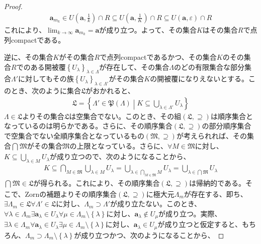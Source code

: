 \documentclass[dvipdfmx]{jsarticle}
\begin{document}
\begin{proof}
\begin{align*}
\mathbf{a}_{m_{k}} \in U\left( \mathbf{a},\frac{1}{k} \right) \cap R \subseteq U\left( \mathbf{a},\frac{1}{K} \right) \cap R \subseteq U\left( \mathbf{a},\varepsilon \right) \cap R
\end{align*}
これにより、$\lim_{k \rightarrow \infty}\mathbf{a}_{m_{k}} = \mathbf{a}$が成り立つ。よって、その集合$K$はその集合$R$で点列compactである。\par
逆に、その集合$K$がその集合$R$で点列compactであるかつ、その集合$K$のその集合$R$でのある開被覆$\left\{ U_{\lambda} \right\}_{\lambda \in \varLambda}$が存在して、その集合$\varLambda$のどの有限集合な部分集合$\varLambda'$に対してもその族$\left\{ U_{\lambda} \right\}_{\lambda \in \varLambda'}$がその集合$K$の開被覆になりえないとする。このとき、次のように集合$\mathfrak{L}$がおかれると、
\begin{align*}
\mathfrak{L} =\left\{ \varLambda'\in \mathfrak{P}(\varLambda) \middle| K \subseteq \bigcup_{\lambda \in \varLambda'} U_{\lambda} \right\}
\end{align*}
$\varLambda\in \mathfrak{L}$よりその集合$\mathfrak{L}$は空集合でない。このとき、その組$\left( \mathfrak{L, \supseteq} \right)$は順序集合となっているのは明らかである。さらに、その順序集合$\left( \mathfrak{L, \supseteq} \right)$の部分順序集合で空集合でない全順序集合となっているもの$\left( \mathfrak{M, \supseteq} \right)$が考えられれば、その集合$\bigcap_{} \mathfrak{M}$がその集合$\mathfrak{M}$の上限となっている。さらに、$\forall M\in \mathfrak{M}$に対し、$K \subseteq \bigcup_{\lambda \in M} U_{\lambda}$が成り立つので、次のようになることから、
\begin{align*}
K \subseteq \bigcap_{M\in \mathfrak{M}} {\bigcup_{\lambda \in M} U_{\lambda}} = \bigcup_{\lambda \in \bigcap_{M\in \mathfrak{M}} M} U_{\lambda} = \bigcup_{\lambda \in \bigcap_{} \mathfrak{M}} U_{\lambda}
\end{align*}
$\bigcap_{} \mathfrak{M}\in \mathfrak{L}$が得られる。これにより、その順序集合$\left( \mathfrak{L, \supseteq} \right)$は帰納的である。そこで、Zornの補題よりその順序集合$\left( \mathfrak{L, \supseteq} \right)$に極大元$\varLambda_{m}$が存在する、即ち、$\exists\varLambda_{m}\in \mathfrak{L\forall}\varLambda'\in \mathfrak{L}$に対し、$\varLambda_{m} \supset \varLambda'$が成り立たない。このとき、$\forall\lambda \in \varLambda_{m}\exists\mathbf{a}_{\lambda} \in U_{\lambda}\forall\mu \in \varLambda_{m} \setminus \left\{ \lambda \right\}$に対し、$\mathbf{a}_{\lambda} \notin U_{\mu}$が成り立つ。実際、$\exists\lambda \in \varLambda_{m}\forall\mathbf{a}_{\lambda} \in U_{\lambda}\exists\mu \in \varLambda_{m} \setminus \left\{ \lambda \right\}$に対し、$\mathbf{a}_{\lambda} \in U_{\mu}$が成り立つと仮定すると、もちろん、$\varLambda_{m} \supset \varLambda_{m} \setminus \left\{ \lambda \right\}$が成り立つかつ、次のようになることから、

\end{proof}
\end{document}
